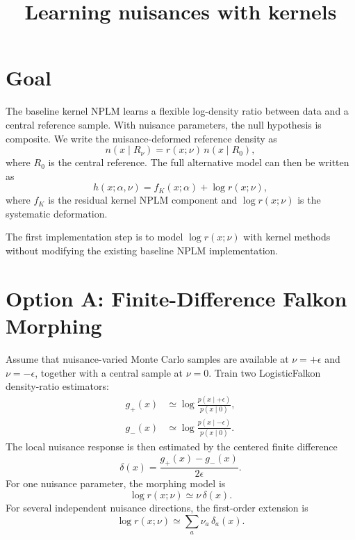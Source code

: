 \documentclass[11pt]{article}
\title{Learning nuisances with kernels}
\author{}
\date{}
\begin{document}
\maketitle

\section{Goal}

The baseline kernel NPLM learns a flexible log-density ratio between data and a
central reference sample. With nuisance parameters, the null hypothesis is
composite. We write the nuisance-deformed reference density as
\begin{equation}
  n(x \mid R_\nu) = r(x;\nu)\,n(x \mid R_0),
\end{equation}
where $R_0$ is the central reference. The full alternative model can then be
written as
\begin{equation}
  h(x;\alpha,\nu) = f_K(x;\alpha) + \log r(x;\nu),
\end{equation}
where $f_K$ is the residual kernel NPLM component and $\log r(x;\nu)$ is the
systematic deformation.

The first implementation step is to model $\log r(x;\nu)$ with kernel methods
without modifying the existing baseline NPLM implementation.

\section{Option A: Finite-Difference Falkon Morphing}

Assume that nuisance-varied Monte Carlo samples are available at
$\nu=+\epsilon$ and $\nu=-\epsilon$, together with a central sample at $\nu=0$.
Train two LogisticFalkon density-ratio estimators:
\begin{align}
  g_+(x) &\simeq \log \frac{p(x\mid +\epsilon)}{p(x\mid 0)}, \\
  g_-(x) &\simeq \log \frac{p(x\mid -\epsilon)}{p(x\mid 0)}.
\end{align}
The local nuisance response is then estimated by the centered finite
difference
\begin{equation}
  \delta(x) =
  \frac{g_+(x)-g_-(x)}{2\epsilon}.
\end{equation}
For one nuisance parameter, the morphing model is
\begin{equation}
  \log r(x;\nu) \simeq \nu\,\delta(x).
\end{equation}
For several independent nuisance directions, the first-order extension is
\begin{equation}
  \log r(x;\nu) \simeq \sum_a \nu_a\,\delta_a(x).
\end{equation}
\end{document}
